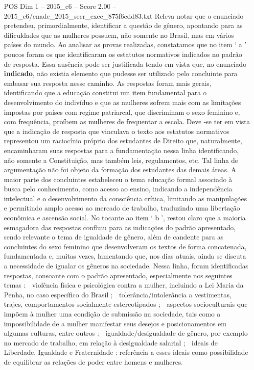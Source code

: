 \begin{textsample}{POS Dim 1 – 2015\_c6 – Score 2.00 – 2015\_c6/enade\_2015\_secr\_exec\_875f6cdd83.txt}
Releva notar que o enunciado pretendeu, primordialmente, identificar a questão de gênero, apontando para as dificuldades que as mulheres possuem, não somente no Brasil, mas em vários países do mundo.
Ao analisar as provas realizadas, constatamos que no item ‘ a ’ poucos foram os que identificaram os estatutos normativos indicados no padrão de resposta.
Essa ausência pode ser justificada tendo em vista que, no enunciado \textbf{indicado}, não existia elemento que pudesse ser utilizado pelo concluinte para embasar sua resposta nesse caminho.
As respostas foram mais gerais, identificando que a educação constitui um item fundamental para o desenvolvimento do indivíduo e que as mulheres sofrem mais com as limitações impostas por países com regime patriarcal, que discriminam o sexo feminino e, com frequência, proíbem as mulheres de frequentar a escola.
Deve -se ter em vista que a indicação de resposta que vinculava o texto aos estatutos normativos representou um raciocínio próprio dos estudantes de Direito que, naturalmente, encaminharam suas respostas para a fundamentação nessa linha identificando, não somente a Constituição, mas também leis, regulamentos, etc.
Tal linha de argumentação não foi objeto da formação dos estudantes das demais áreas.
A maior parte dos concluintes estabeleceu o tema educação formal associado à busca pelo conhecimento, como acesso ao ensino, indicando a independência intelectual e o desenvolvimento da consciência crítica, limitando as manipulações e permitindo amplo acesso ao mercado de trabalho, traduzindo uma libertação econômica e ascensão social.
No tocante ao item ‘ b ’, restou claro que a maioria esmagadora das respostas confluiu para as indicações do padrão apresentado, sendo relevante o tema de igualdade de gênero, além de candente para as concluintes do sexo feminino que desenvolveram os textos de forma concatenada, fundamentada e, muitas vezes, lamentando que, nos dias atuais, ainda se discuta a necessidade de igualar os gêneros na sociedade.
Nessa linha, foram identificadas respostas, consoante com o padrão apresentado, especialmente nos seguintes temas :  violência física e psicológica contra a mulher, incluindo a Lei Maria da Penha, no caso específico do Brasil ;  tolerância/intolerância a vestimentas, trajes, comportamentos socialmente estereotipados ;  aspectos socioculturais que impõem à mulher uma condição de submissão na sociedade, tais como a impossibilidade de a mulher manifestar seus desejos e posicionamentos em algumas culturas, entre outros ;  igualdade/desigualdade de gênero, por exemplo no mercado de trabalho, em relação à desigualdade salarial ;  ideais de Liberdade, Igualdade e Fraternidade : referência a esses ideais como possibilidade de equilibrar as relações de poder entre homens e mulheres.

\end{textsample}
